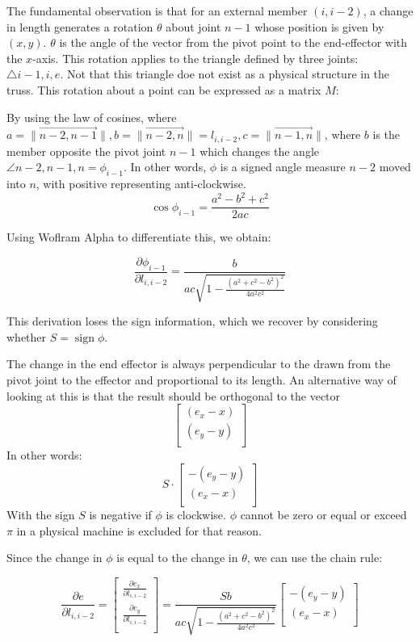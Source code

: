 \documentclass[11pt]{article}
\DeclareMathOperator{\sign}{sign}
\begin{document}
The fundamental observation is that for an external member $(i,i-2)$, a change in length generates a rotation $\theta$ about joint $n-1$
whose position is given by $(x,y)$. $\theta$ is the angle of the vector from the pivot point to the end-effector with the $x$-axis.
This rotation applies to the triangle defined by three joints: $\triangle i-1,i,e$. Not that this triangle doe not exist as a physical
structure in the truss. This rotation about a point can be expressed as a matrix $M$:

By using the law of cosines, where $a = \|\overrightarrow{n-2,n-1}\|, b = \|\overrightarrow{n-2,n}\| = l_{i,i-2}, c = \|\overrightarrow{n-1,n}\| $,
where $b$ is the member opposite the pivot joint $n-1$ which changes the angle $\angle n-2,n-1,n = \phi_{i-1}$. In other words, $\phi$ is a signed angle measure
$n-2$ moved into $n$, with positive representing anti-clockwise.
\[
\cos{\phi_{i-1}} = \frac{a^2 - b^2 + c^2}{2 a c}
\]

Using Woflram Alpha to differentiate this, we obtain:

\[
\frac{\partial \phi_{i-1}}{\partial l_{i,i-2}} = \frac{b}{ac\sqrt{1 - \frac{(a^2 + c^2 - b^2)^2}{4a^2c^2}}}
\]

This derivation loses the sign information, which we recover by considering whether $S = \sign{\phi}$.

The change in the end effector is always perpendicular to the drawn from the pivot joint to the effector and proportional to its length.
An alternative way of looking at this is that the result should be orthogonal to the vector
\[
\begin{bmatrix}
           (e_x  - x) \\
           (e_y - y)  \\
\end{bmatrix}
\]
In other words:
\[
S \cdot
\begin{bmatrix}
           - (e_y  - y) \\
           (e_x - x)  \\
\end{bmatrix}
\]
With the sign $S$ is negative if $\phi$ is clockwise. $\phi$ cannot be zero or equal or exceed $\pi$ in a physical machine is excluded for that reason.

Since the change in $\phi$ is equal to the change in $\theta$, we can use the chain rule:

\[
\frac{\partial e}{\partial  l_{i,i-2}} = \begin{bmatrix}
           \frac{\partial e_x}{\partial l_{i,i-2}} \\
           \frac{\partial e_y}{\partial l_{i,i-2}} \\
         \end{bmatrix} = \frac{Sb}{ac\sqrt{1 - \frac{(a^2 + c^2 - b^2)^2}{4a^2c^2}}} \begin{bmatrix}
           -(e_y -y)  \\
           (e_x - x )  \\
         \end{bmatrix}
\]
\end{document}
